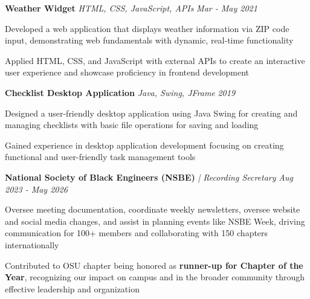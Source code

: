 \documentclass[letterpaper]{article}
\begin{document}
    {\textbf{Weather Widget}} {\sl HTML, CSS, JavaScript, APIs} \hfill \textsl{Mar - May 2021}\\
    \vspace{-2mm}
    \begin{tightitemize} \itemsep -1mm

        \item Developed a web application that displays weather information via ZIP code input, demonstrating web fundamentals with dynamic, real-time functionality
        
        \item Applied HTML, CSS, and JavaScript with external APIs to create an interactive user experience and showcase proficiency in frontend development
        
    \end{tightitemize}
    \vspace{-2mm}

    {\textbf{Checklist Desktop Application}} {\sl Java, Swing, JFrame} \hfill \textsl{2019}\\
    \vspace{-2mm}
    \begin{tightitemize} \itemsep -1mm

        \item Designed a user-friendly desktop application using Java Swing for creating and managing checklists with basic file operations for saving and loading
        
        \item Gained experience in desktop application development focusing on creating functional and user-friendly task management tools
        
    \end{tightitemize}
    \vspace{-2mm}

\vspace{1mm}

    \textbf{National Society of Black Engineers (NSBE)} \textit{| Recording Secretary} \hfill \textsl{Aug 2023 - May 2026}\\
    \vspace{-2mm}
    \begin{tightitemize} \itemsep -1mm
    
        \item Oversee meeting documentation, coordinate weekly newsletters, oversee website and social media changes, and assist in planning events like NSBE Week, driving communication for 100+ members and collaborating with 150 chapters internationally
        
        \item Contributed to OSU chapter being honored as \textbf{runner-up for Chapter of the Year}, recognizing our impact on campus and in the broader community through effective leadership and organization
        
    \end{tightitemize}
    \vspace{-1mm}
\end{document}
